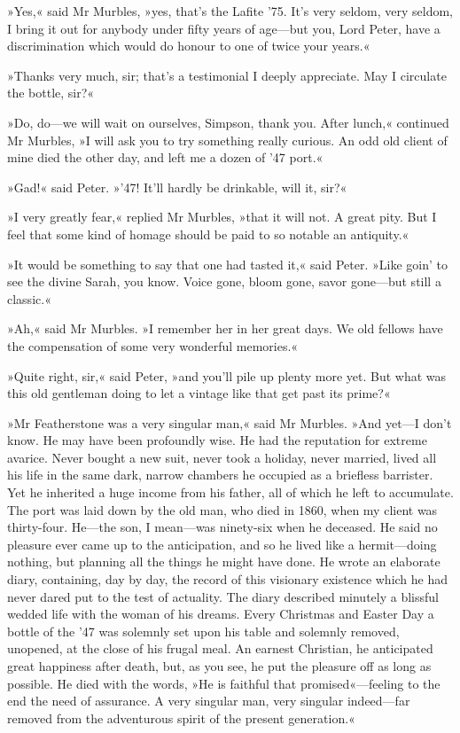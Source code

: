 »Yes,« said Mr Murbles, »yes, that's the Lafite '75. It's very seldom, very seldom, I bring it out for anybody under fifty years of age\allowbreak---\allowbreak but you, Lord Peter, have a discrimination which would do honour to one of twice your years.«

»Thanks very much, sir; that's a testimonial I deeply appreciate. May I circulate the bottle, sir?«

»Do, do\allowbreak---\allowbreak we will wait on ourselves, Simpson, thank you. After lunch,« continued Mr Murbles, »I will ask you to try something really curious.  An odd old client of mine died the other day, and left me a dozen of '47 port.«

»Gad!« said Peter. »'47! It'll hardly be drinkable, will it, sir?«

»I very greatly fear,« replied Mr Murbles, »that it will not. A great pity. But I feel that some kind of homage should be paid to so notable an antiquity.«

»It would be something to say that one had tasted it,« said Peter. »Like goin' to see the divine Sarah, you know. Voice gone, bloom gone, savor gone\allowbreak---\allowbreak but still a classic.«

»Ah,« said Mr Murbles. »I remember her in her great days. We old fellows have the compensation of some very wonderful memories.«

»Quite right, sir,« said Peter, »and you'll pile up plenty more yet.  But what was this old gentleman doing to let a vintage like that get past its prime?«

»Mr Featherstone was a very singular man,« said Mr Murbles. »And yet\allowbreak---\allowbreak I don't know. He may have been profoundly wise. He had the reputation for extreme avarice. Never bought a new suit, never took a holiday, never married, lived all his life in the same dark, narrow chambers he occupied as a briefless barrister. Yet he inherited a huge income from his father, all of which he left to accumulate. The port was laid down by the old man, who died in 1860, when my client was thirty-four. He\allowbreak---\allowbreak the son, I mean\allowbreak---\allowbreak was ninety-six when he deceased. He said no pleasure ever came up to the anticipation, and so he lived like a hermit\allowbreak---\allowbreak doing nothing, but planning all the things he might have done. He wrote an elaborate diary, containing, day by day, the record of this visionary existence which he had never dared put to the test of actuality. The diary described minutely a blissful wedded life with the woman of his dreams. Every Christmas and Easter Day a bottle of the '47 was solemnly set upon his table and solemnly removed, unopened, at the close of his frugal meal. An earnest Christian, he anticipated great happiness after death, but, as you see, he put the pleasure off as long as possible. He died with the words, »He is faithful that promised«---feeling to the end the need of assurance. A very singular man, very singular indeed\allowbreak---\allowbreak far removed from the adventurous spirit of the present generation.«

